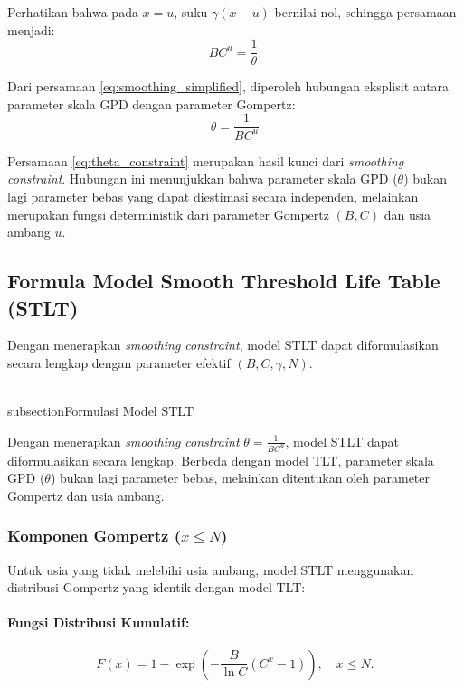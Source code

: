 Perhatikan bahwa pada $x = u$, suku $\gamma(x-u)$ bernilai nol, sehingga persamaan menjadi:
\begin{equation}
BC^u = \frac{1}{\theta}.
\label{eq:smoothing_simplified}
\end{equation}

Dari persamaan \eqref{eq:smoothing_simplified}, diperoleh hubungan eksplisit antara parameter skala GPD dengan parameter Gompertz:
\begin{equation}
\boxed{\theta = \frac{1}{BC^u}}
\label{eq:theta_constraint}
\end{equation}

Persamaan \eqref{eq:theta_constraint} merupakan hasil kunci dari \textit{smoothing constraint}. Hubungan ini menunjukkan bahwa parameter skala GPD ($\theta$) bukan lagi parameter bebas yang dapat diestimasi secara independen, melainkan merupakan fungsi deterministik dari parameter Gompertz $(B, C)$ dan usia ambang $u$.

\subsection{Formula Model Smooth Threshold Life Table (STLT)}

Dengan menerapkan \textit{smoothing constraint}, model STLT dapat diformulasikan secara lengkap dengan parameter efektif $(B, C, \gamma, N)$.

\\subsection{Formulasi Model STLT}

Dengan menerapkan \textit{smoothing constraint} $\theta = \frac{1}{BC^u}$, model STLT dapat diformulasikan secara lengkap. Berbeda dengan model TLT, parameter skala GPD ($\theta$) bukan lagi parameter bebas, melainkan ditentukan oleh parameter Gompertz dan usia ambang.

\subsubsection{Komponen Gompertz ($x \leq N$)}

Untuk usia yang tidak melebihi usia ambang, model STLT menggunakan distribusi Gompertz yang identik dengan model TLT:

\paragraph{Fungsi Distribusi Kumulatif:}
\begin{equation}
F(x) = 1 - \exp\left(-\frac{B}{\ln C}(C^x - 1)\right), \quad x \leq N.
\label{eq:stlt_gompertz_cdf}
\end{equation}

